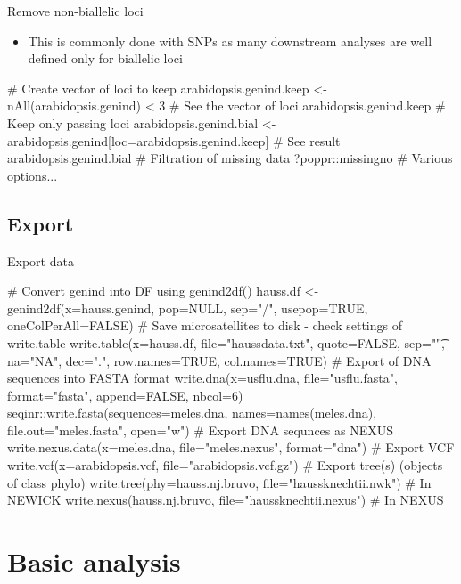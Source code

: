 \documentclass[compress, ucs, xelatex, 11pt, xcolor=svgnames,
  hyperref={
    bookmarks=true,
    unicode=true,
    colorlinks=true,
    pdftitle={Molecular data in R},
    plainpages=false,
    pdfauthor={Vojtech Zeisek},
    pdfsubject={Course about phylogeny and evolution in R},
    pdfcreator={XeLaTeX},
    pdfkeywords={R, evolution, phylogeny, molecular data},
    linkcolor=Tomato,
    anchorcolor=SaddleBrown,
    citecolor=Goldenrod,
    filecolor=DarkMagenta,
    menucolor=Sienna,
    urlcolor=DarkTurquoise,
    pdftex},
  url={hyphens, lowtilde} %
  ]{beamer}
\begin{document}
\begin{frame}[fragile]{Remove non-biallelic loci}
  \begin{itemize}
    \item This is commonly done with SNPs as many downstream analyses are well defined only for biallelic loci
  \end{itemize}
  \begin{spluscode}
    # Create vector of loci to keep
    arabidopsis.genind.keep <- nAll(arabidopsis.genind) < 3
    # See the vector of loci
    arabidopsis.genind.keep
    # Keep only passing loci
    arabidopsis.genind.bial <-
      arabidopsis.genind[loc=arabidopsis.genind.keep]
    # See result
    arabidopsis.genind.bial
    # Filtration of missing data
    ?poppr::missingno # Various options...
  \end{spluscode}
\end{frame}

\subsection{Export}

\begin{frame}[fragile]{Export data}
  \begin{spluscode}
    # Convert genind into DF using genind2df()
    hauss.df <- genind2df(x=hauss.genind, pop=NULL, sep="/",
      usepop=TRUE, oneColPerAll=FALSE)
    # Save microsatellites to disk - check settings of write.table
    write.table(x=hauss.df, file="haussdata.txt", quote=FALSE,
      sep="\t", na="NA", dec=".", row.names=TRUE, col.names=TRUE)
    # Export of DNA sequences into FASTA format
    write.dna(x=usflu.dna, file="usflu.fasta", format="fasta",
      append=FALSE, nbcol=6)
    seqinr::write.fasta(sequences=meles.dna, names=names(meles.dna),
      file.out="meles.fasta", open="w")
    # Export DNA sequnces as NEXUS
    write.nexus.data(x=meles.dna, file="meles.nexus", format="dna")
    # Export VCF
    write.vcf(x=arabidopsis.vcf, file="arabidopsis.vcf.gz")
    # Export tree(s) (objects of class phylo)
    write.tree(phy=hauss.nj.bruvo, file="haussknechtii.nwk") # In NEWICK
    write.nexus(hauss.nj.bruvo, file="haussknechtii.nexus") # In NEXUS
  \end{spluscode}
\end{frame}

\section{Basic analysis}
\end{document}
